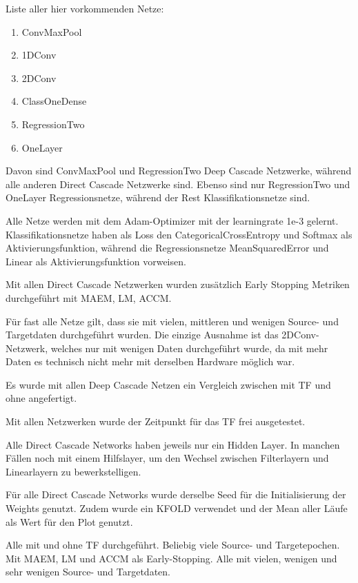 
Liste aller hier vorkommenden Netze:

\begin{enumerate}
    \item ConvMaxPool
    \item 1DConv
    \item 2DConv
    \item ClassOneDense
    \item RegressionTwo
    \item OneLayer
\end{enumerate}

Davon sind ConvMaxPool und RegressionTwo Deep Cascade Netzwerke, während alle anderen Direct Cascade Netzwerke sind. 
Ebenso sind nur RegressionTwo und OneLayer Regressionsnetze, während der Rest Klassifikationsnetze sind. 

Alle Netze werden mit dem Adam-Optimizer mit der learningrate 1e-3 gelernt. Klassifikationsnetze haben als Loss den 
CategoricalCrossEntropy und Softmax als Aktivierungsfunktion, während die Regressionsnetze MeanSquaredError und Linear als 
Aktivierungsfunktion vorweisen. 

Mit allen Direct Cascade Netzwerken wurden zusätzlich Early Stopping Metriken durchgeführt mit MAEM, LM, ACCM. 

Für fast alle Netze gilt, dass sie mit vielen, mittleren und wenigen Source- und Targetdaten durchgeführt wurden. Die 
einzige Ausnahme ist das 2DConv-Netzwerk, welches nur mit wenigen Daten durchgeführt wurde, da mit mehr Daten es 
technisch nicht mehr mit derselben Hardware möglich war. 

Es wurde mit allen Deep Cascade Netzen ein Vergleich zwischen mit TF und ohne angefertigt. 

Mit allen Netzwerken wurde der Zeitpunkt für das TF frei ausgetestet. 

Alle Direct Cascade Networks haben jeweils nur ein Hidden Layer. In manchen Fällen noch mit einem Hilfslayer, um den Wechsel 
zwischen Filterlayern und Linearlayern zu bewerkstelligen. 

Für alle Direct Cascade Networks wurde derselbe Seed für die Initialisierung der Weights genutzt. Zudem wurde ein KFOLD 
verwendet und der Mean aller Läufe als Wert für den Plot genutzt.

\iffalse
Alle mit und ohne TF durchgeführt. Beliebig viele Source- und Targetepochen. Mit MAEM, LM und ACCM als Early-Stopping. 
Alle mit vielen, wenigen und sehr wenigen Source- und Targetdaten. 

